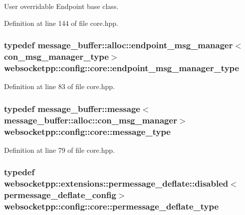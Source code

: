 User overridable Endpoint base class. 



Definition at line 144 of file core.\+hpp.

\hypertarget{structwebsocketpp_1_1config_1_1core_ac2a5caeef488e2f177bb8f92a37d2f34}{}
\subsubsection[{endpoint\+\_\+msg\+\_\+manager\+\_\+type}]{\setlength{\rightskip}{0pt plus 5cm}typedef {\bf message\+\_\+buffer\+::alloc\+::endpoint\+\_\+msg\+\_\+manager}$<${\bf con\+\_\+msg\+\_\+manager\+\_\+type}$>$ {\bf websocketpp\+::config\+::core\+::endpoint\+\_\+msg\+\_\+manager\+\_\+type}}\label{structwebsocketpp_1_1config_1_1core_ac2a5caeef488e2f177bb8f92a37d2f34}


Definition at line 83 of file core.\+hpp.

\hypertarget{structwebsocketpp_1_1config_1_1core_afb4c134e0a311beebe31a50458855279}{}
\subsubsection[{message\+\_\+type}]{\setlength{\rightskip}{0pt plus 5cm}typedef {\bf message\+\_\+buffer\+::message}$<${\bf message\+\_\+buffer\+::alloc\+::con\+\_\+msg\+\_\+manager}$>$ {\bf websocketpp\+::config\+::core\+::message\+\_\+type}}\label{structwebsocketpp_1_1config_1_1core_afb4c134e0a311beebe31a50458855279}


Definition at line 79 of file core.\+hpp.

\hypertarget{structwebsocketpp_1_1config_1_1core_a563c271682eaf48c114f0efca4072c3f}{}
\subsubsection[{permessage\+\_\+deflate\+\_\+type}]{\setlength{\rightskip}{0pt plus 5cm}typedef {\bf websocketpp\+::extensions\+::permessage\+\_\+deflate\+::disabled}$<${\bf permessage\+\_\+deflate\+\_\+config}$>$ {\bf websocketpp\+::config\+::core\+::permessage\+\_\+deflate\+\_\+type}}\label{structwebsocketpp_1_1config_1_1core_a563c271682eaf48c114f0efca4072c3f}


